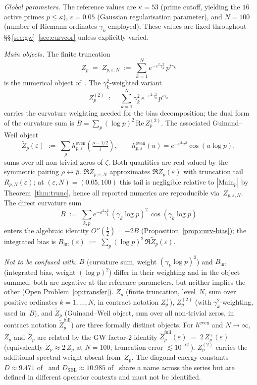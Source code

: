 \documentclass[11pt]{article}
\newcommand{\Zt}{\widetilde{Z}}
\newcommand{\DSEL}{D_{\mathrm{SEL}}}
\begin{document}
\medskip
\emph{Global parameters.}
The reference values are $\kappa=53$ (prime cutoff, yielding the
$16$ active primes $p\le\kappa$), $\varepsilon=0.05$ (Gaussian
regularisation parameter), and $N=100$ (number of Riemann ordinates
$\gamma_k$ employed).
These values are fixed throughout
\S\S\,\ref{sec:gw}--\ref{sec:curvcor} unless explicitly varied.

\medskip
\emph{Main objects.}
The finite truncation
\[
Z_p \;=\; Z_{p,\varepsilon,N} \;:=\;
\sum_{k=1}^{N} e^{-\varepsilon^2\gamma_k^2}\,p^{i\gamma_k}
\]
is the numerical object of~\cite{Paper4,Paper5}.
The $\gamma_k^2$-weighted variant
\[
Z_p^{(2)} \;:=\; \sum_{k=1}^{N} \gamma_k^2\,
e^{-\varepsilon^2\gamma_k^2}\,p^{i\gamma_k}
\]
carries the curvature weighting needed for the bias
decomposition; the dual form of the curvature sum is
$B = \sum_p (\log p)^2\,\mathrm{Re}\,Z_p^{(2)}$.
The associated Guinand--Weil object
\[
\Zt_p(\varepsilon) \;:=\; \sum_{\rho}
h^{\mathrm{even}}_{p,\varepsilon}\!\left(\tfrac{\rho-1/2}{i}\right),
\qquad
h^{\mathrm{even}}_{p,\varepsilon}(u)=e^{-\varepsilon^2 u^2}\cos(u\log p),
\]
sums over all non-trivial zeros of $\zeta$.
Both quantities are real-valued by the symmetric pairing
$\rho\leftrightarrow\bar\rho$.
$\Re Z_{p,\varepsilon,N}$ approximates $\Re\Zt_p(\varepsilon)$ with
truncation tail $R_{p,N}(\varepsilon)$; at
$(\varepsilon,N)=(0.05,100)$ this tail is negligible relative to
$|\mathrm{Main}_p|$ by Theorem~\ref{thm:trunc}, hence all reported
numerics are reproducible via~$Z_{p,\varepsilon,N}$.
The direct curvature sum
\[
B \;:=\; \sum_{k,p} e^{-\varepsilon^2\gamma_k^2}\,
(\gamma_k\log p)^2\,\cos(\gamma_k\log p)
\]
enters the algebraic identity $O''(\tfrac12)=-2B$
(Proposition~\ref{prop:curv-bias}); the integrated bias is
$B_{\mathrm{int}}(\varepsilon)\;:=\;\sum_p (\log p)^2\,\Re\Zt_p(\varepsilon)$.

\medskip
\emph{Not to be confused with.}
$B$ (curvature sum, weight $(\gamma_k\log p)^2$) and $B_{\mathrm{int}}$
(integrated bias, weight $(\log p)^2$) differ in their weighting and
in the object summed; both are negative at the reference parameters,
but neither implies the other (Open Problem~\ref{op:transfer}).
$Z_p$ (finite truncation, level~$N$, sum over positive ordinates
$k=1,\ldots,N$, in contract notation $Z_p^{+}$),
$Z_p^{(2)}$ (with $\gamma_k^2$-weighting, used in~$B$), and
$\Zt_p$ (Guinand--Weil object, sum over all non-trivial zeros,
in contract notation $\widetilde Z_p^{\mathrm{full}}$) are three
formally distinct objects. For $h^{\mathrm{even}}$ and $N\to\infty$,
$Z_p$ and $\Zt_p$ are related by the GW factor-2 identity
$\widetilde Z_p^{\mathrm{full}}(\varepsilon)
  \;=\; 2\,Z_p^{+}(\varepsilon)$
(equivalently $\Zt_p\approx 2\,Z_p$ at $N=100$, truncation error
$\lesssim 10^{-61}$). $Z_p^{(2)}$ carries the additional spectral
weight absent from~$Z_p$.
The diagonal-energy constants $D\approx 9.471$ of~\cite{Paper2} and
$\DSEL\approx 10.985$ of~\cite{Paper5} share a name across the series
but are defined in different operator contexts and must not be
identified.
\end{document}
